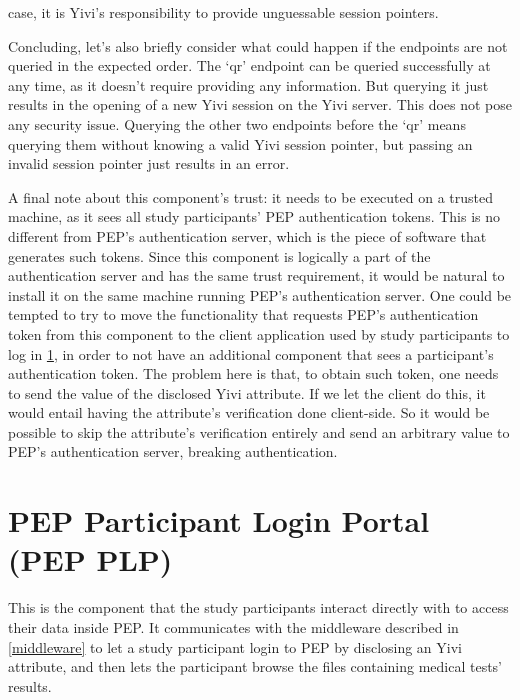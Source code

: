 \documentclass{report}
\begin{document}
case, it is Yivi's responsibility to provide unguessable session pointers. \par
Concluding, let's also briefly consider what could happen if the endpoints are not queried in the expected order. The \enquote*{qr} endpoint can be queried successfully at any
time, as it doesn't require providing any information. But querying it just results in the opening of a new Yivi session on the Yivi server. This does not pose any security
issue. Querying the other two endpoints before the \enquote*{qr} means querying them without knowing a valid Yivi session pointer, but passing an invalid session pointer just
results in an error. \par
A final note about this component's trust: it needs to be executed on a trusted machine, as it sees all study participants' PEP authentication tokens. This is no different from
PEP's authentication server, which is the piece of software that generates such tokens. Since this component is logically a part of the authentication server and has the same trust
requirement, it would be natural to install it on the same machine running PEP's authentication server. One could be tempted to try to move the functionality that requests PEP's
authentication token from this component to the client application used by study participants to log in \ref{pep_plp}, in order to not have an additional component that sees a
participant's authentication token. The problem here is that, to obtain such token, one needs to send the value of the disclosed Yivi attribute. If we let the client do this, it
would entail having the attribute's verification done client-side. So it would be possible to skip the attribute's verification entirely and send an arbitrary value to PEP's
authentication server, breaking authentication.


\section{PEP Participant Login Portal (PEP PLP)}\label{pep_plp}
This is the component that the study participants interact directly with to access their data inside PEP. It communicates with the middleware described in \ref{middleware} to
let a study participant login to PEP by disclosing an Yivi attribute, and then lets the participant browse the files containing medical tests' results. 
\end{document}
